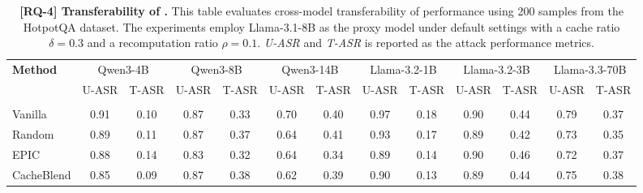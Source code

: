\begin{table}[t]
\centering
\footnotesize
\caption{\textbf{[RQ-4] Transferability of \sys.} This table evaluates cross-model transferability of \sys performance using 200 samples from the HotpotQA dataset. The experiments employ Llama-3.1-8B as the proxy model under default settings with a cache ratio $\delta = 0.3$ and a recomputation ratio $\rho=0.1$. \textit{U-ASR} and \textit{T-ASR} is reported as the attack performance metrics.}
\label{tab:rq4_main}
\setlength{\tabcolsep}{0pt} 
\begin{tabular*}{\textwidth}{@{\extracolsep{\fill}} l *{12}{c} }
\toprule
\multirow{2}{*}{\textbf{Method}} & \multicolumn{2}{c}{Qwen3-4B} & \multicolumn{2}{c}{Qwen3-8B} & \multicolumn{2}{c}{Qwen3-14B} & \multicolumn{2}{c}{Llama-3.2-1B} & \multicolumn{2}{c}{Llama-3.2-3B} & \multicolumn{2}{c}{Llama-3.3-70B} \\
\cmidrule(lr){2-3} \cmidrule(lr){4-5} \cmidrule(lr){6-7} \cmidrule(lr){8-9} \cmidrule(lr){10-11} \cmidrule(lr){12-13}
 & U-ASR & T-ASR & U-ASR & T-ASR & U-ASR & T-ASR & U-ASR & T-ASR & U-ASR & T-ASR & U-ASR & T-ASR \\
\midrule
\rowcolor{sectionbg}
\multicolumn{13}{l}{\textbf{Llama-3.1-8B}} \\
Vanilla     & 0.91 & 0.10 & 0.87 & 0.33 & 0.70 & 0.40 & 0.97 & 0.18 & 0.90 & 0.44 & 0.79 & 0.37 \\
Random      & 0.89 & 0.11 & 0.87 & 0.37 & 0.64 & 0.41 & 0.93 & 0.17 & 0.89 & 0.42 & 0.73 & 0.35 \\
EPIC        & 0.88 & 0.14 & 0.83 & 0.32 & 0.64 & 0.34 & 0.89 & 0.14 & 0.90 & 0.46 & 0.72 & 0.37 \\
CacheBlend  & 0.85 & 0.09 & 0.87 & 0.38 & 0.62 & 0.39 & 0.90 & 0.13 & 0.89 & 0.44 & 0.75 & 0.38 \\
\bottomrule
\end{tabular*}
\end{table}